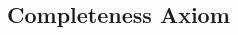 \documentclass[8pt,landscape]{article}
\begin{document}
\begin{multicols}{3}





    \subsection{Completeness Axiom}





\end{multicols}
\end{document}
